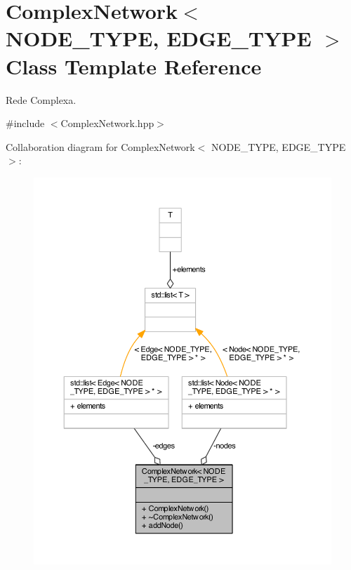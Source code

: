 \hypertarget{class_complex_network}{\section{Complex\+Network$<$ N\+O\+D\+E\+\_\+\+T\+Y\+P\+E, E\+D\+G\+E\+\_\+\+T\+Y\+P\+E $>$ Class Template Reference}
\label{class_complex_network}
}


Rede Complexa.  




{\ttfamily \#include $<$Complex\+Network.\+hpp$>$}



Collaboration diagram for Complex\+Network$<$ N\+O\+D\+E\+\_\+\+T\+Y\+P\+E, E\+D\+G\+E\+\_\+\+T\+Y\+P\+E $>$\+:\nopagebreak
\begin{figure}[H]
\begin{center}
\leavevmode
\includegraphics[width=350pt]{class_complex_network__coll__graph}
\end{center}
\end{figure}
